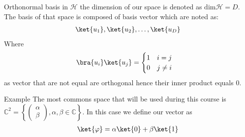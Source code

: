 \begin{parag}{Orthonormal basis in $\mathcal{H}$}
    the dimension of our space is denoted as $\text{dim} \mathcal{H} = D$. The basis of that space is composed of basis vector which are noted as:
	\begin{align*} 
		\ket{u_1}, \ket{u_2}, \ldots, \ket{u_D}
	\end{align*}
	Where 
	\begin{align*} 
		\bra{u_i}\ket{u_j} = \begin{cases}
			1 \mathspace i = j\\ 0 \mathspace j \neq i
		\end{cases} 
	\end{align*}
	as vector that are not equal are orthogonal hence their inner product equals $0$.
	\begin{subparag}{Example}
	    The most commons space that will be used during this course is $\mathbb{C}^2 =  \left\{\begin{pmatrix} \alpha \\ \beta \end{pmatrix}, \alpha, \beta \in \mathbb{C} \right\}$. In this case we define our vector as 
		\begin{align*} 
			\ket{\phi} = \alpha \ket{0} + \beta \ket{1} 
		\end{align*}
	\end{subparag}
\end{parag}

